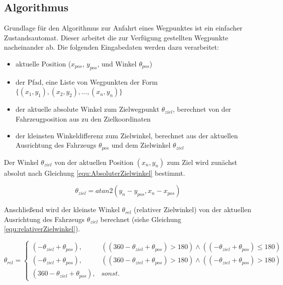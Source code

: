 \subsection{Algorithmus}

Grundlage für den Algorithmus zur Anfahrt eines Wegpunktes ist ein einfacher Zustandsautomat. Dieser arbeitet die zur Verfügung gestellten Wegpunkte nacheinander ab. Die folgenden Eingabedaten werden dazu verarbeitet:


\begin{itemize}
\item aktuelle Position ($x_{pos}$, $y_{pos}$, und Winkel $ \theta_{pos} $)
\item der Pfad, eine Liste von Wegpunkten der Form $ \{(x_1, y_1), (x_2, y_2), ..., (x_n, y_n)\} $
\item der aktuelle absolute Winkel zum Zielwegpunkt $\theta_{ziel}$, berechnet von der Fahrzeugposition aus zu den Zielkoordinaten
\item der kleinsten Winkeldifferenz zum Zielwinkel, berechnet aus der aktuellen Ausrichtung des Fahrzeugs $\theta_{pos}$ und dem Zielwinkel $\theta_{ziel}$
\end{itemize}


Der Winkel $\theta_{ziel}$ von der aktuellen Position $(x_n, y_n)$ zum Ziel wird zunächst absolut nach Gleichung  \ref{equ:AbsoluterZielwinkel} bestimmt.

\begin{equation}
\theta_{ziel} = atan2(y_n - y_{pos}, x_n - x_{pos})
\label{equ:AbsoluterZielwinkel}
\end{equation}


Anschließend wird der kleinste Winkel $\theta_{rel}$ (relativer Zielwinkel) von der aktuellen Ausrichtung des Fahrzeugs $\theta_{ziel}$ berechnet (siehe Gleichung \ref{equ:relativerZielwinkel}).


\begin{equation}
\theta_{rel} = \left\{
\begin{array}{ll}
(-\theta_{ziel} + \theta_{pos}) , & ((360 - \theta_{ziel} + \theta_{pos}) > 180) \wedge ((-\theta_{ziel} + \theta_{pos}) \leq 180) \\
(-\theta_{ziel} + \theta_{pos}) , & ((360 - \theta_{ziel} + \theta_{pos}) > 180) \wedge ((-\theta_{ziel} + \theta_{pos}) > 180) \\
(360 - \theta_{ziel} + \theta_{pos}), & sonst.
\end{array}
\right.
\label{equ:relativerZielwinkel}
\end{equation}


